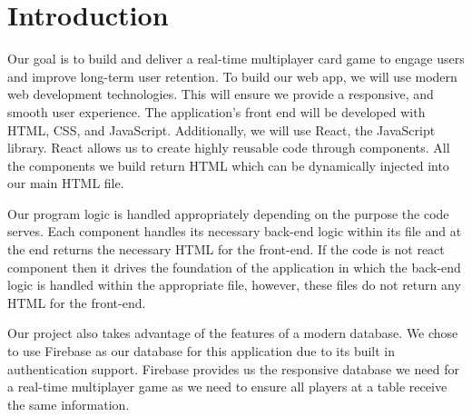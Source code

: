 \section{Introduction}



Our goal is to build and deliver a real-time multiplayer card game to engage users and improve long-term user retention. To build our web app, we will use modern web development technologies. This will ensure we provide a responsive, and smooth user experience. The application's front end will be developed with HTML, CSS, and JavaScript. Additionally, we will use React, the JavaScript library. React allows us to create highly reusable code through components. All the components we build return HTML which can be dynamically injected into our main HTML file. 

    Our program logic is handled appropriately depending on the purpose the code serves. Each component handles its necessary back-end logic within its file and at the end returns the necessary HTML for the front-end. If the code is not react component then it drives the foundation of the application in which the back-end logic is handled within the appropriate file, however, these files do not return any HTML for the front-end. 

    Our project also takes advantage of the features of a modern database. We chose to use Firebase as our database for this application due to its built in authentication support. Firebase provides us the responsive database we need for a real-time multiplayer game as we need to ensure all players at a table receive the same information. 
